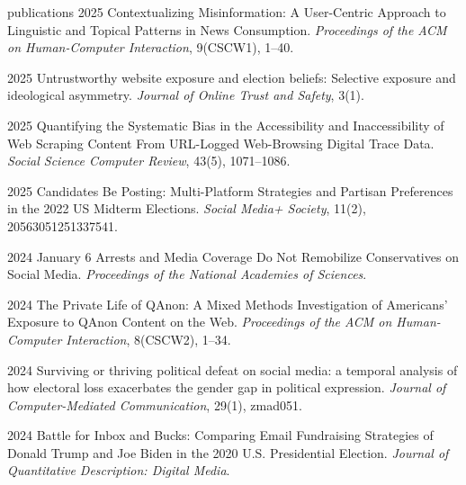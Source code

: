 \begin{publist}{publications}
  {2025}
  {Contextualizing Misinformation: A User-Centric Approach to Linguistic and Topical Patterns in News Consumption.}
  {\textit{Proceedings of the ACM on Human-Computer Interaction}, 9(CSCW1), 1--40. }
  {}

  {2025}
  {Untrustworthy website exposure and election beliefs: Selective exposure and ideological asymmetry.}
  {\textit{Journal of Online Trust and Safety}, 3(1). }
  {}

  {2025}
  {Quantifying the Systematic Bias in the Accessibility and Inaccessibility of Web Scraping Content From URL-Logged Web-Browsing Digital Trace Data.}
  {\textit{Social Science Computer Review}, 43(5), 1071--1086. }
  {}

  {2025}
  {Candidates Be Posting: Multi-Platform Strategies and Partisan Preferences in the 2022 US Midterm Elections.}
  {\textit{Social Media+ Society}, 11(2), 20563051251337541. }
  {}

  {2024}
  {January 6 Arrests and Media Coverage Do Not Remobilize Conservatives on Social Media.}
  {\textit{Proceedings of the National Academies of Sciences}. }
  {}

  {2024}
  {The Private Life of QAnon: A Mixed Methods Investigation of Americans' Exposure to QAnon Content on the Web.}
  {\textit{Proceedings of the ACM on Human-Computer Interaction}, 8(CSCW2), 1--34. }
  {}

  {2024}
  {Surviving or thriving political defeat on social media: a temporal analysis of how electoral loss exacerbates the gender gap in political expression.}
  {\textit{Journal of Computer-Mediated Communication}, 29(1), zmad051. }
  {}

  {2024}
  {Battle for Inbox and Bucks: Comparing Email Fundraising Strategies of Donald Trump and Joe Biden in the 2020 U.S. Presidential Election.}
  {\textit{Journal of Quantitative Description: Digital Media}. }
  {}


\end{publist}
